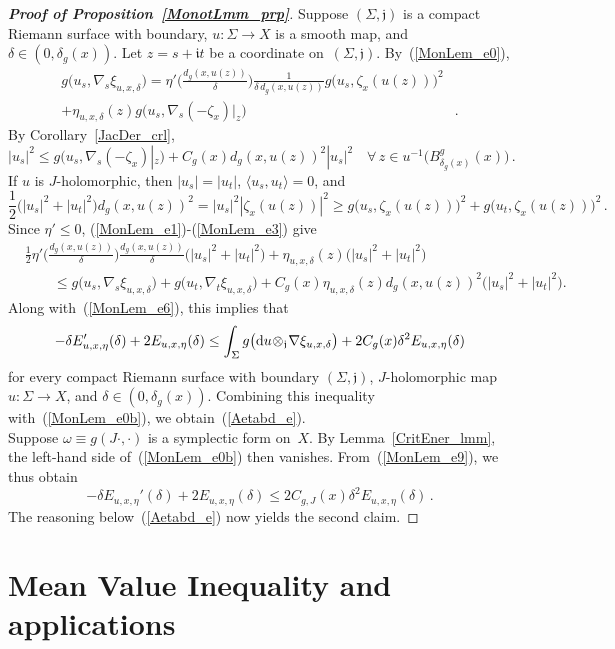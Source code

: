 \documentclass[11pt]{article}
\numberwithin{equation}{section}
\theoremstyle{definition}
\def\BE#1{\begin{equation}\label{#1}}
\def\EE{\end{equation}}
\def\eref#1{(\ref{#1})}
\def\lr#1{\langle#1\rangle}
\def\lra{\longrightarrow}
\def\fI{\mathfrak i}
\def\fj{\mathfrak j}
\def\de{\delta}
\def\na{\nabla}
\def\om{\omega}
\def\ze{\zeta}
\def\Si{\Sigma}
\def\nd{\textnormal{d}}
\begin{document}
\begin{proof}[{\bf\emph{Proof of Proposition~\ref{MonotLmm_prp}}}]
\noindent
Suppose $(\Si,\fj)$ is a compact Riemann surface with boundary,
$u\!:\Si\!\lra\!X$ is a smooth map, and $\de\!\in\!(0,\de_g(x))$. 
Let $z\!=\!s\!+\!\fI t$ be a coordinate on~$(\Si,\fj)$.
By~\eref{MonLem_e0},
\BE{MonLem_e1}\begin{split}
g\big(u_s,\na_s\xi_{u,x,\de}\big)
=\eta'\bigg(\!\frac{d_g(x,u(z))}{\de}\!\bigg)\frac{1}{\de\,d_g(x,u(z))}g\big(u_s,\ze_x(u(z))\big)^2&\\
+\eta_{u,x,\de}(z)g\big(u_s,\na_s(-\ze_x)|_z\big)&.
\end{split}\EE
By Corollary~\ref{JacDer_crl}, 
\BE{MonLem_e2}
|u_s|^2\le g\big(u_s,\na_s(-\ze_x)|_z\big) +C_g(x)d_g(x,u(z))^2|u_s|^2
\quad\forall\,z\!\in\!u^{-1}\big(B_{\de_g(x)}^g(x)\big)\,.\EE
If $u$ is $J$-holomorphic, then $|u_s|\!=\!|u_t|$, $\lr{u_s,u_t}\!=\!0$, and
\BE{MonLem_e3}
\frac12\big(|u_s|^2\!+\!|u_t|^2\big)d_g(x,u(z))^2=|u_s|^2|\ze_x(u(z))|^2
\ge g\big(u_s,\ze_x(u(z))\big)^2+g\big(u_t,\ze_x(u(z))\big)^2\,.\EE
Since $\eta'\!\le\!0$,  \eref{MonLem_e1}-\eref{MonLem_e3} give
\BE{MonLem_e4}\begin{split}
&\frac12\eta'\bigg(\!\frac{d_g(x,u(z))}{\de}\!\bigg)\frac{d_g(x,u(z))}{\de}\big(|u_s|^2\!+\!|u_t|^2\big)
+\eta_{u,x,\de}(z)\big(|u_s|^2\!+\!|u_t|^2\big)\\
&\qquad\le g\big(u_s,\na_s\xi_{u,x,\de}\big)+g\big(u_t,\na_t\xi_{u,x,\de}\big)+
C_g(x)\eta_{u,x,\de}(z)d_g(x,u(z))^2\big(|u_s|^2\!+\!|u_t|^2\big).
\end{split}\EE
Along with~\eref{MonLem_e6}, this implies that 
\BE{MonLem_e9}-\de E_{u,x,\eta}'(\de)+2E_{u,x,\eta}(\de)\le 
\int_{\Si}g\big(\nd u\!\otimes_{\fj}\!\na\xi_{u,x,\de}\big)
+2C_g(x)\de^2E_{u,x,\eta}(\de)\EE
for every compact Riemann surface with boundary $(\Si,\fj)$,
$J$-holomorphic map \hbox{$u\!:\Si\!\lra\!X$}, and $\de\!\in\!(0,\de_g(x))$.
Combining this inequality with~\eref{MonLem_e0b}, we obtain~\eref{Aetabd_e}.\\

\noindent
Suppose $\om\!\equiv\!g(J\cdot,\cdot)$ is a symplectic form on~$X$.
By Lemma~\ref{CritEner_lmm}, the left-hand side of~\eref{MonLem_e0b} then vanishes.
From~\eref{MonLem_e9}, we thus obtain
$$-\de E_{u,x,\eta}'(\de)+2E_{u,x,\eta}(\de)\le 2C_{g,J}(x)\de^2 E_{u,x,\eta}(\de)\,.$$
The reasoning below~\eref{Aetabd_e} now yields the second claim.
\end{proof}






\section{Mean Value Inequality and applications}
\label{EBnd_sec}
\end{document}
